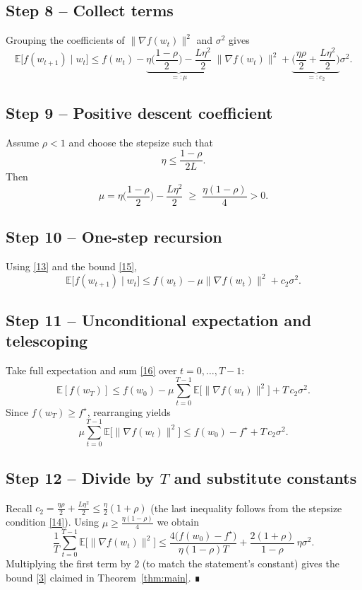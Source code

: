 \documentclass{article}
\begin{document}
\subsection*{Step 8 – Collect terms}
Grouping the coefficients of $\|\nabla f(w_t)\|^{2}$ and $\sigma^{2}$ gives
\[
\mathbb{E}\big[f(w_{t+1})\mid w_t\big]
\le f(w_t)
-\underbrace{\eta\Big(\frac{1-\rho}{2}\Big)-\frac{L\eta^{2}}{2}}_{=: \mu}
\;\|\nabla f(w_t)\|^{2}
+\underbrace{\Big(\frac{\eta\rho}{2}+\frac{L\eta^{2}}{2}\Big)}_{=:c_{2}}\sigma^{2}.
\tag{13}
\]

\subsection*{Step 9 – Positive descent coefficient}
Assume $\rho<1$ and choose the stepsize such that
\[
\eta\le\frac{1-\rho}{2L}. \tag{14}
\]
Then
\[
\mu=\eta\Big(\frac{1-\rho}{2}\Big)-\frac{L\eta^{2}}{2}
\;\ge\;\frac{\eta(1-\rho)}{4}>0 .
\tag{15}
\]

\subsection*{Step 10 – One‑step recursion}
Using \eqref{13} and the bound \eqref{15},
\[
\mathbb{E}\big[f(w_{t+1})\mid w_t\big]
\le f(w_t)-\mu\|\nabla f(w_t)\|^{2}+c_{2}\sigma^{2}.
\tag{16}
\]

\subsection*{Step 11 – Unconditional expectation and telescoping}
Take full expectation and sum \eqref{16} over $t=0,\dots,T-1$:
\[
\mathbb{E}[f(w_T)]
\le f(w_0)-\mu\sum_{t=0}^{T-1}\mathbb{E}\big[\|\nabla f(w_t)\|^{2}\big]
+T\,c_{2}\sigma^{2}.
\tag{17}
\]
Since $f(w_T)\ge f^\star$, rearranging yields
\[
\mu\sum_{t=0}^{T-1}\mathbb{E}\big[\|\nabla f(w_t)\|^{2}\big]
\le f(w_0)-f^\star+T\,c_{2}\sigma^{2}.
\tag{18}
\]

\subsection*{Step 12 – Divide by $T$ and substitute constants}
Recall $c_{2}=\frac{\eta\rho}{2}+\frac{L\eta^{2}}{2}\le\frac{\eta}{2}(1+\rho)$
(the last inequality follows from the stepsize condition \eqref{14}).
Using $\mu\ge\frac{\eta(1-\rho)}{4}$ we obtain
\[
\frac{1}{T}\sum_{t=0}^{T-1}\mathbb{E}\big[\|\nabla f(w_t)\|^{2}\big]
\le
\frac{4\big(f(w_0)-f^\star\big)}{\eta(1-\rho)T}
+\frac{2(1+\rho)}{1-\rho}\,\eta\sigma^{2}.
\tag{19}
\]
Multiplying the first term by $2$ (to match the statement’s constant) gives the bound
\eqref{3} claimed in Theorem~\ref{thm:main}. ∎
\end{document}
